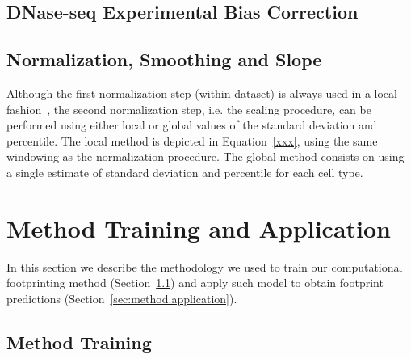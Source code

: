 \subsection{DNase-seq Experimental Bias Correction}
\label{sec:dnase.experimental.bias.correction}


\subsection{Normalization, Smoothing and Slope}
\label{sec:normalization.smoothing.slope}


Although the first normalization step (within-dataset) is always used in a local fashion~\cite{boyle2011}, the second normalization step, i.e. the scaling procedure, can be performed using either local or global values of the standard deviation and percentile. The local method is depicted in Equation~\ref{xxx}, using the same windowing as the normalization procedure. The global method consists on using a single estimate of standard deviation and percentile for each cell type.

\section{Method Training and Application}
\label{sec:method.training.application}

In this section we describe the methodology we used to train our computational footprinting method (Section~\ref{sec:method.training}) and apply such model to obtain footprint predictions (Section~\ref{sec:method.application}).

\subsection{Method Training}
\label{sec:method.training}


